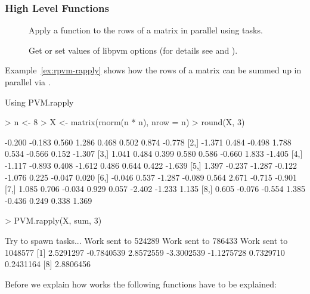 \subsubsection{High Level Functions}
\begin{description}
\item[] Apply a function
   to the rows of a matrix  in
  parallel using  tasks.
\item[] Get or set values of libpvm
  options (for details see \cite{nali07rpvm} and \cite{geist94pvm}).
\end{description}

Example~\ref{ex:rpvm-rapply} shows how the rows of a matrix 
can be summed up in parallel via .

\begin{Example} Using PVM.rapply
\begin{Schunk}
\begin{Sinput}
> n <- 8
> X <- matrix(rnorm(n * n), nrow = n)
> round(X, 3)
\end{Sinput}
\begin{Soutput}
       [,1]   [,2]   [,3]   [,4]   [,5]   [,6]   [,7]   [,8]
[1,] -0.200 -0.183  0.560  1.286  0.468  0.502  0.874 -0.778
[2,] -1.371  0.484 -0.498  1.788  0.534 -0.566  0.152 -1.307
[3,]  1.041  0.484  0.399  0.580  0.586 -0.660  1.833 -1.405
[4,] -1.117 -0.893  0.408 -1.612  0.486  0.644  0.422 -1.639
[5,]  1.397 -0.237 -1.287 -0.122 -1.076  0.225 -0.047  0.020
[6,] -0.046  0.537 -1.287 -0.089  0.564  2.671 -0.715 -0.901
[7,]  1.085  0.706 -0.034  0.929  0.057 -2.402 -1.233  1.135
[8,]  0.605 -0.076 -0.554  1.385 -0.436  0.249  0.338  1.369
\end{Soutput}
\begin{Sinput}
> PVM.rapply(X, sum, 3)
\end{Sinput}
\begin{Soutput}
Try to spawn tasks...
Work sent to  524289 
Work sent to  786433 
Work sent to  1048577 
[1]  2.5291297 -0.7840539  2.8572559 -3.3002539 -1.1275728  0.7329710  0.2431164
[8]  2.8806456
\end{Soutput}
\end{Schunk}
\label{ex:rpvm-rapply}
\end{Example}

Before we explain how  works the following 
functions have to be explained:

